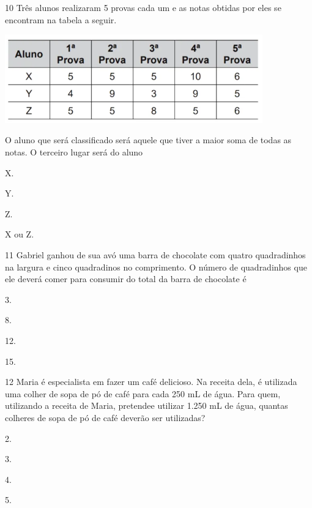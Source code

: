 \begin{mdframed}[linewidth=2pt,linecolor=salmao,roundcorner=2pt]
\begin{escolha}
{\begin{escolha}
\num{10} Três alunos realizaram 5 provas cada um e as notas obtidas por eles se
encontram na tabela a seguir.


\includegraphics[width=4.38462in,height=1.50708in]{media/image157.png}

O aluno que será classificado será aquele que tiver a maior
soma de todas as notas. O terceiro lugar será do aluno

\begin{escolha}
\item
  X.
\item
  Y.
\item
  Z.
\item
  X ou Z.
\end{escolha}


\num{11} Gabriel ganhou de sua avó uma barra de chocolate com quatro quadradinhos na largura e cinco quadradinos no comprimento.
O número de quadradinhos que ele deverá comer para consumir  do total
da barra de chocolate é

\begin{escolha}
\item
  3.
\item
  8.
\item
  12.
\item
  15.
\end{escolha}


\num{12} Maria é especialista em fazer um café delicioso. Na receita dela, é utilizada uma colher de sopa de pó de café para cada 250 mL
de água. Para quem, utilizando a receita de Maria, pretendee utilizar 1.250
mL de água, quantas colheres de sopa de pó de café deverão ser utilizadas?

\begin{escolha}
\item
  2.
\item
  3.
\item
  4.
\item
  5.
\end{escolha}



\end{escolha}}
\end{escolha}
\end{mdframed}
